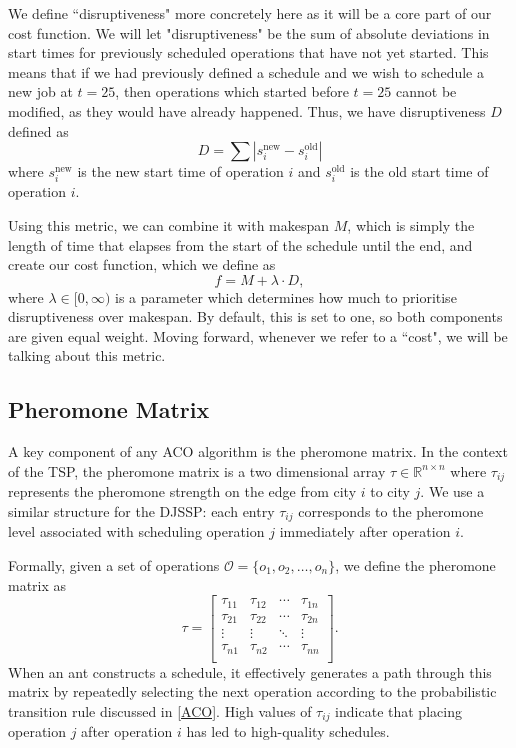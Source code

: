 \documentclass[final-report]{report-template}
\begin{document}
We define ``disruptiveness" more concretely here as it will be a core part of our cost function. We will let "disruptiveness" be the sum of absolute deviations in start times for previously scheduled operations that have not yet started. This means that if we had previously defined a schedule and we wish to schedule a new job at $t=25$, then operations which started before $t=25$ cannot be modified, as they would have already happened. Thus, we have disruptiveness $D$ defined as 
\[
D = \sum |s_i^{\text{new}} - s_i^{\text{old}}|
\]
where $s_i^{\text{new}}$ is the new start time of operation $i$ and $s_i^{\text{old}}$ is the old start time of operation $i$. 

Using this metric, we can combine it with makespan $M$, which is simply the length of time that elapses from the start of the schedule until the end, and create our cost function, which we define as 
\[
f = M + \lambda \cdot D,
\]
where $\lambda \in [0, \infty)$ is a parameter which determines how much to prioritise disruptiveness over makespan. By default, this is set to one, so both components are given equal weight. Moving forward, whenever we refer to a ``cost", we will be talking about this metric.

\subsection{Pheromone Matrix}
A key component of any ACO algorithm is the pheromone matrix. In the context of the TSP, the pheromone matrix is a two dimensional array $\tau \in \mathbb{R}^{n \times n}$ where $\tau_{ij}$ represents the pheromone strength on the edge from city $i$ to city $j$. We use a similar structure for the DJSSP: each entry $\tau_{ij}$ corresponds to the pheromone level associated with scheduling operation $j$ immediately after operation $i$.

Formally, given a set of operations $\mathcal{O} = \{o_1, o_2, \dots, o_n\}$, we define the pheromone matrix as
\[
\tau = 
\begin{bmatrix}
\tau_{11} & \tau_{12} & \cdots & \tau_{1n} \\
\tau_{21} & \tau_{22} & \cdots & \tau_{2n} \\
\vdots & \vdots & \ddots & \vdots \\
\tau_{n1} & \tau_{n2} & \cdots & \tau_{nn} \\
\end{bmatrix}.
\]
When an ant constructs a schedule, it effectively generates a path through this matrix by repeatedly selecting the next operation according to the probabilistic transition rule discussed in \ref{ACO}. High values of $\tau_{ij}$ indicate that placing operation $j$ after operation $i$ has led to high-quality schedules. 
\end{document}
